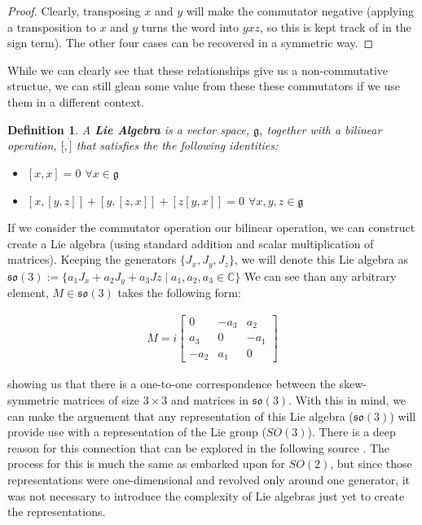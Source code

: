 \documentclass[10pt]{ucthesis}
\newcommand{\C}{\mathbb{C}}
\newtheorem{definition}{Definition}[chapter]
\begin{document}
\begin{proof}
Clearly, transposing $x$ and $y$ will make the commutator negative (applying a transposition to $x$ and $y$ turns the word into $yxz$, so this is kept track of in the sign term). The other four cases can be recovered in a symmetric way. \end{proof}

While we can clearly see that these relationships give us a non-commutative structue, we can still glean some value from these these commutators if we use them in a different context.

\begin{definition}
	A \textbf{Lie Algebra} is a vector space, $\mathfrak{g}$, together with a bilinear operation, $[\dot,\dot]$ that satisfies the the following identities:
\begin{itemize}
	\item$ [x,x] = 0$  $\forall x\in\mathfrak{g}$
	\item $[x,[y,z]] + [y,[z,x]] + [z[y,x]]= 0 $ $\forall x,y,z\in\mathfrak{g}$
\end{itemize}
\end{definition}

If we consider the commutator operation our bilinear operation, we can construct create a Lie algebra (using standard addition and scalar multiplication of matrices). Keeping the generators $\{J_x,J_y,J_z\}$, we will denote this Lie algebra as $\mathfrak{so}(3) := \{a_1J_x + a_2J_y + a_3Jz \mid a_1,a_2,a_3\in\C\}$ We can see than any arbitrary element, $M\in \mathfrak{so}(3)$ takes the following form:

\begin{equation}
	\begin{aligned}
		M=i\begin{bmatrix}
		0 & -a_3 & a_2 \\
		 a_3 & 0 & -a_1\\
		-a_2 & a_1 & 0
		\end{bmatrix}
	\end{aligned}
\end{equation} 

showing us that there is a one-to-one correspondence between the skew-symmetric matrices of size $3\times 3$ and matrices in $\mathfrak{so}(3)$. With this in mind, we can make the arguement that any representation of this Lie algebra ($\mathfrak{so}(3)$) will provide use with a representation of the Lie group ($SO(3)$). There is a deep reason for this connection that can be explored in the following source \cite{Hall}. The process for this is much the same as embarked upon for $SO(2)$, but since those representations were one-dimensional and revolved only around one generator, it was not necessary to introduce the complexity of Lie algebras just yet to create the representations. 
\end{document}
